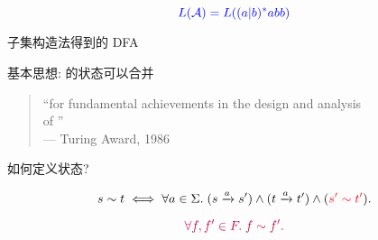 \begin{frame}{}

  \[
    \textcolor{blue}{L(\mathcal{A}) = L((a|b)^{\ast}abb)}
  \]


  \begin{center}
    子集构造法得到的 DFA
  \end{center}
\end{frame}

\begin{frame}{}
  \begin{center}
    基本思想: 的状态可以合并

    \vspace{0.30cm}

    \vspace{0.30cm}
    \begin{quote}
      \centering
      ``for fundamental achievements in the design and analysis \\
      of '' \\
      \hfill --- Turing Award, 1986
    \end{quote}
  \end{center}
\end{frame}

\begin{frame}{}
  \begin{center}
    如何定义状态?
  \end{center}


  \[
    s \sim t \iff \forall a \in \Sigma.\; 
      (s \xrightarrow{a} s') \land (t \xrightarrow{a} t') \land (\textcolor{red}{s' \sim t'}).
  \]

  \pause
  \vspace{0.20cm}
  \begin{center}
  \end{center}

  \pause
  \vspace{-0.50cm}
  \[
    \textcolor{purple}{\forall f, f' \in F.\; f \sim f'.}
  \]
\end{frame}

